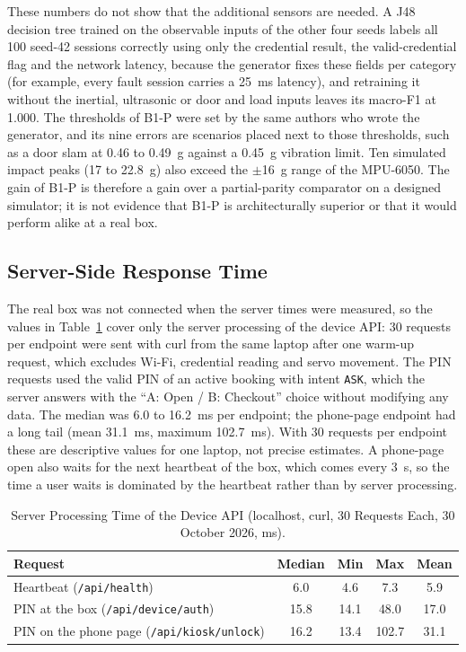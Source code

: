 \documentclass[journal,onecolumn]{IEEEtran}
\begin{document}
These numbers do not show that the additional sensors are needed. A J48 decision tree trained on the observable
inputs of the other four seeds labels all 100 seed-42 sessions correctly using only the credential result, the
valid-credential flag and the network latency, because the generator fixes these fields per category (for example,
every fault session carries a 25~ms latency), and retraining it without the inertial, ultrasonic or door and load
inputs leaves its macro-F1 at 1.000. The thresholds of B1-P were set by the same authors who wrote the generator, and
its nine errors are scenarios placed next to those thresholds, such as a door slam at 0.46 to 0.49~g against a 0.45~g
vibration limit. Ten simulated impact peaks (17 to 22.8~g) also exceed the $\pm$16~g range of the MPU-6050. The gain of
B1-P is therefore a gain over a partial-parity comparator on a designed simulator; it is not evidence that B1-P is
architecturally superior or that it would perform alike at a real box.

\subsection{Server-Side Response Time}
\label{sec:latency}

The real box was not connected when the server times were measured, so the values in Table~\ref{tab:latency} cover
only the server processing of the device API: 30 requests per endpoint were sent with curl from the same laptop after
one warm-up request, which excludes Wi-Fi, credential reading and servo movement. The PIN requests used the valid PIN
of an active booking with intent \texttt{ASK}, which the server answers with the ``A: Open / B: Checkout'' choice without
modifying any data. The median was 6.0 to 16.2~ms per endpoint; the phone-page endpoint had a long tail (mean
31.1~ms, maximum 102.7~ms). With 30 requests per endpoint these are descriptive values for one laptop, not precise
estimates. A phone-page open also waits for the next heartbeat of the box, which comes every 3~s, so the time a user
waits is dominated by the heartbeat rather than by server processing.

\begin{table}[!htbp]
\renewcommand{\arraystretch}{1.02}
\centering
\small
\caption{Server Processing Time of the Device API (localhost, curl, 30 Requests Each, 30 October 2026, ms).}
\label{tab:latency}
\vspace{5pt}
\begin{tabular}{l c c c c}
\hline
Request & Median & Min & Max & Mean \\
\hline
\rule{0pt}{2.6ex}Heartbeat (\texttt{/api/health})                     & 6.0  & 4.6  & 7.3   & 5.9 \\
PIN at the box (\texttt{/api/device/auth})           & 15.8 & 14.1 & 48.0  & 17.0 \\
PIN on the phone page (\texttt{/api/kiosk/unlock})   & 16.2 & 13.4 & 102.7 & 31.1 \\
\hline
\end{tabular}
\end{table}
\end{document}
